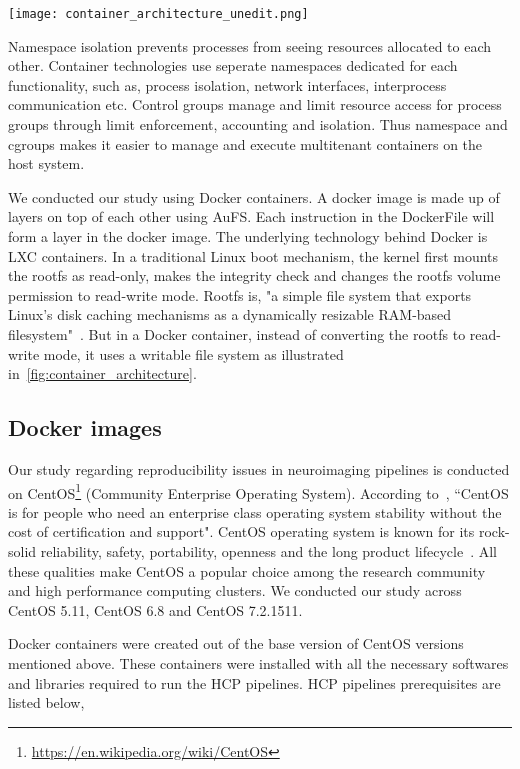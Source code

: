 \begin{center}
\texttt{[image: container\_architecture\_unedit.png]}
\label{fig:container_architecture}
\end{center}

Namespace isolation prevents processes from seeing resources allocated to each other. Container technologies use seperate namespaces dedicated for each functionality, such as, process isolation, network interfaces, interprocess communication etc. Control groups manage and limit resource access for process groups through limit enforcement, accounting and isolation. Thus namespace and cgroups makes it easier to manage and execute multitenant containers on the host system.

We conducted our study using Docker containers. A docker image is made up of layers on top of each other using AuFS. Each instruction in the DockerFile will form a layer in the docker image. The underlying technology behind Docker is LXC containers. In a traditional Linux boot mechanism, the kernel first mounts the rootfs as read-only, makes the integrity check and changes the rootfs volume permission to read-write mode. Rootfs is, "a simple file system that exports Linux's disk caching mechanisms as a dynamically resizable RAM-based filesystem"~\cite{Rootfs}. But in a Docker container, instead of converting the rootfs to read-write mode, it uses a writable file system as illustrated in~\ref{fig:container_architecture}. 

\subsection{Docker images}
Our study regarding reproducibility issues in neuroimaging pipelines is conducted on CentOS\footnote{\url{https://en.wikipedia.org/wiki/CentOS}} (Community Enterprise Operating System). According to~\cite{CentOS}, ``CentOS is for people who need an enterprise class operating system stability without the cost of certification and support". CentOS operating system is known for its rock-solid reliability, safety, portability, openness and the long product lifecycle~\cite{5665431}. All these qualities make CentOS a popular choice among the research community and high performance computing clusters. We conducted our study across CentOS 5.11, CentOS 6.8 and CentOS 7.2.1511.

Docker containers were created out of the base version of CentOS versions mentioned above. These containers were installed with all the necessary softwares and libraries required to run the HCP pipelines. HCP pipelines prerequisites are listed below,

